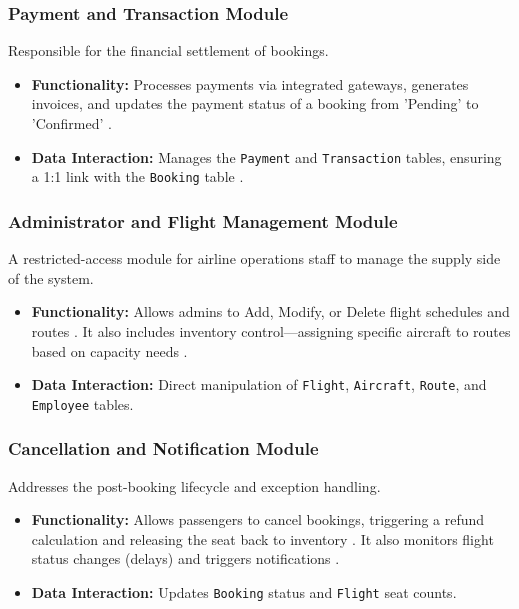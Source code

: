 \documentclass[12pt, a4paper]{article}
\begin{document}
	\subsubsection{Payment and Transaction Module}
	Responsible for the financial settlement of bookings.
	\begin{itemize}
		\item \textbf{Functionality:} Processes payments via integrated gateways, generates invoices, and updates the payment status of a booking from 'Pending' to 'Confirmed' \cite{ref16, ref28}.
		\item \textbf{Data Interaction:} Manages the \texttt{Payment} and \texttt{Transaction} tables, ensuring a 1:1 link with the \texttt{Booking} table \cite{ref29}.
	\end{itemize}
	
	\subsubsection{Administrator and Flight Management Module}
	A restricted-access module for airline operations staff to manage the supply side of the system.
	\begin{itemize}
		\item \textbf{Functionality:} Allows admins to Add, Modify, or Delete flight schedules and routes \cite{ref26}. It also includes inventory control—assigning specific aircraft to routes based on capacity needs \cite{ref30}.
		\item \textbf{Data Interaction:} Direct manipulation of \texttt{Flight}, \texttt{Aircraft}, \texttt{Route}, and \texttt{Employee} tables.
	\end{itemize}
	
	\subsubsection{Cancellation and Notification Module}
	Addresses the post-booking lifecycle and exception handling.
	\begin{itemize}
		\item \textbf{Functionality:} Allows passengers to cancel bookings, triggering a refund calculation and releasing the seat back to inventory \cite{ref2}. It also monitors flight status changes (delays) and triggers notifications \cite{ref10, ref31}.
		\item \textbf{Data Interaction:} Updates \texttt{Booking} status and \texttt{Flight} seat counts.
	\end{itemize}
	
\end{document}
